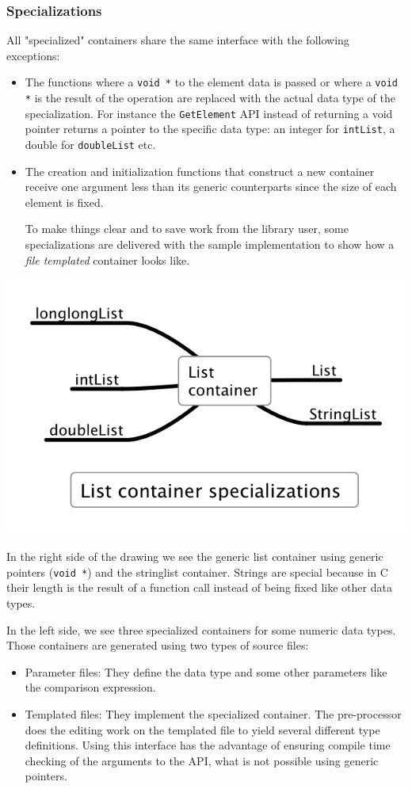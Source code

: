 \documentclass[12pt,a4paper]{memoir} %
\newif\iftth
\newenvironment{ShorterItemize}{
\begin{itemize}
\iftth\else
  \setlength{\itemsep}{1pt}
  \setlength{\parskip}{0pt}
  \setlength{\parsep}{0pt}
\fi
}{\end{itemize}
}
\begin{document}
\subsubsection{Specializations}
All "specialized" containers share the same interface with the following exceptions:
\begin{ShorterItemize}
\item The functions where a \verb,void *, to the element data is passed or where a \verb,void *, is the result of the operation are replaced with the 
actual data type of the specialization. For instance the \verb,GetElement, API instead of returning a void pointer returns a pointer to the specific 
data type: an 
integer for \verb,intList,, a double for \verb,doubleList, etc.
\item The creation and initialization functions that construct a new container receive one argument less than its generic counterparts since the
size of each element is fixed.

To make things clear and to save work from the library user, some specializations are delivered with the sample implementation to show how a
\textsl{file templated} container looks like.
\end{ShorterItemize}
\begin{center}
\includegraphics[scale=0.625]{ListContainerSpecializations.png}
\end{center}
In the right side of the drawing we see the generic list container using generic pointers (\verb,void *,) and the stringlist container. Strings are 
special because in C their length is the result of a function call instead of being fixed like other data types.

In the left side, we see three specialized containers for some numeric data types. Those containers are generated using two types of source files:
\begin{ShorterItemize}
\item Parameter files: They define the data type and some other parameters like the comparison expression.
\item Templated files: They implement the specialized container. The pre-processor does the editing work on the templated file to yield several 
different type definitions. Using this interface has the advantage of ensuring compile time checking of the arguments to the API, what is not
possible using generic pointers.
\end{ShorterItemize}
\end{document}
